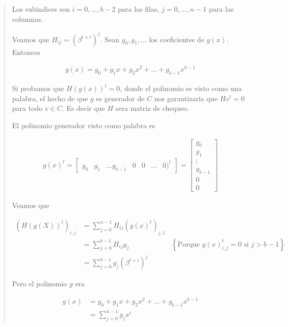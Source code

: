 \documentclass[a4paper]{article}
\begin{document}
\begin{quote}
    Los subindices son $i = 0, \ldots, b - 2$ para las filas, $j = 0, \ldots, n
    - 1$ para las columnas.

    Veamos que $H_{ij} = \left(\beta^{t + i}\right)^{j}$. Sean $g_0, g_1,
    \ldots$ los coeficientes de $g(x)$. Entonces 

    \begin{align*}
        g(x) = g_0 + g_1x + g_2x^2 + \ldots + g_{b-1}x^{b-1}
    \end{align*}

    Si probamos que $H\left( g(x) \right)^t = 0 $, donde el polinomio es visto
    como una palabra, el hecho de que $g$ es generador de $C$ nos garantizaria
    que $Hv^t = 0$ para todo $v \in C$. Es decir que $H$ sera matriz de
    chequeo.

    El polinomio generador visto como palabra es 

    \begin{align*}
        g(x)^t = \begin{bmatrix} 
            g_0 & g_1 & \ldots g_{b-1} & 0 & 0 & \ldots & 0)^t 
        \end{bmatrix} 
            = \begin{bmatrix} 
                g_0 \\ g_1 \\ \vdots \\ g_{b-1} \\ 0 \\ 0
            \end{bmatrix}  
    \end{align*}

    Veamos que 

    \begin{align*}
        \left( H(g(X))^t \right)_{i, j} &= \sum_{j=0}^{n-1} H_{ij} (g(x)^t)_{j, 1} \\ 
                                        &= \sum_{j=0}^{b-1} H_{ij} g_j &\left\{ \text{Porque $g(x)^t_{i, j} = 0$ si $j > b -1$} \right\} \\ 
                                        &= \sum_{j=0}^{b-1}g_j \left( \beta^{t+i} \right)^{j}
    \end{align*}

    Pero el polinomio $g$ era 

    \begin{align*}
        g(x) &= g_0 + g_1x + g_2x^2 + \ldots + g_{b-1}x^{b-1} \\ 
             &=\sum_{j=0}^{h - 1}g_jx^i
    \end{align*}


\end{quote}
\end{document}
